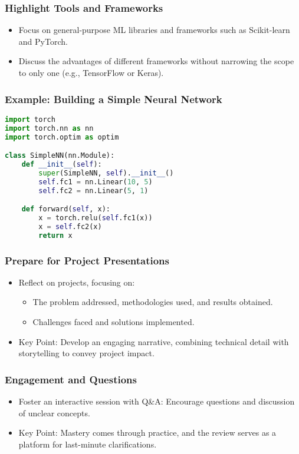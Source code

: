 \documentclass[aspectratio=169]{beamer}
\begin{document}
\begin{frame}
    \frametitle{Highlight Tools and Frameworks}
    \begin{itemize}
        \item Focus on general-purpose ML libraries and frameworks such as Scikit-learn and PyTorch.
        \item Discuss the advantages of different frameworks without narrowing the scope to only one (e.g., TensorFlow or Keras).
    \end{itemize}
\end{frame}

\begin{frame}[fragile]
    \frametitle{Example: Building a Simple Neural Network}
    \begin{lstlisting}[language=Python]
import torch
import torch.nn as nn
import torch.optim as optim

class SimpleNN(nn.Module):
    def __init__(self):
        super(SimpleNN, self).__init__()
        self.fc1 = nn.Linear(10, 5)
        self.fc2 = nn.Linear(5, 1)

    def forward(self, x):
        x = torch.relu(self.fc1(x))
        x = self.fc2(x)
        return x
    \end{lstlisting}
\end{frame}

\begin{frame}
    \frametitle{Prepare for Project Presentations}
    \begin{itemize}
        \item Reflect on projects, focusing on:
        \begin{itemize}
            \item The problem addressed, methodologies used, and results obtained.
            \item Challenges faced and solutions implemented.
        \end{itemize}
        \item Key Point: Develop an engaging narrative, combining technical detail with storytelling to convey project impact.
    \end{itemize}
\end{frame}

\begin{frame}
    \frametitle{Engagement and Questions}
    \begin{itemize}
        \item Foster an interactive session with Q&A: Encourage questions and discussion of unclear concepts.
        \item Key Point: Mastery comes through practice, and the review serves as a platform for last-minute clarifications.
    \end{itemize}
\end{frame}
\end{document}
